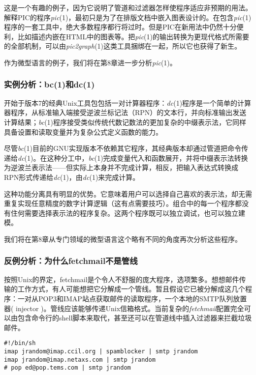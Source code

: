 \documentclass[12pt,oneside]{book}
\begin{document}
\begin{common-format}
这是一个有趣的例子，因为它说明了管道和过滤器怎样使程序适应非预期的用法。解释PIC的程序\textit{pic}(1)，最初只是为了在排版文档中嵌入图表设计的。在包含\textit{pic}(1)程序的一套工具中，绝大多数程序都行将过时。但是PIC在新用法中仍然十分便利，比如描述内嵌在HTML中的图表等。把\textit{pic}(1)的输出转换为更现代格式所需要的全部机制，可以由\textit{pic2graph}(1)这类工具捆绑在一起，所以它也获得了新生。

作为微型语言的例子，我们将在第8章进一步分析\textit{pic}(1)。

\subsubsection{实例分析：bc(1)和dc(1)}
开始于版本7的经典Unix工具包包括一对计算器程序：\textit{dc}(1)程序是一个简单的计算器程序，从标准输入端接受逆波兰标记法（RPN）的文本行，并向标准输出发送计算结果；\textit{bc}(1)程序接受类似传统代数记数法的更加复杂的中缀表示法，它同样具备设置和读取变量并为复杂公式定义函数的能力。

尽管\textit{bc}(1)目前的GNU实现版本不依赖其它程序，其经典版本却通过管道把命令传递给\textit{dc}(1)。在这种分工中，\textit{bc}(1)完成变量代入和函数展开，并将中缀表示法转换为逆波兰表示法——但实际上本身并不完成计算，相反，把输入表达式转换成RPN形式传递给\textit{dc}(1)，由\textit{dc}(1)来完成计算。

这种功能分离具有明显的优势。它意味着用户可以选择自己喜欢的表示法，却无需重复实现任意精度的数字计算逻辑（这有点需要技巧）。组合中的每一个程序都没有住何需要选择表示法的程序复杂。这两个程序既可以独立调试，也可以独立建模。

我们将在第8章从专门领域的微型语言这个略有不同的角度再次分析这些程序。


\subsubsection{反例分析：为什么fetchmail不是管线}
按照Unix的界定，fetchmail是个令人不舒服的庞大程序，选项繁多。想想邮件传输的工作方式，有人可能想把它分解成一个管线。暂且假设它已被分解成这几个程序：一对从POP3和IMAP站点获取邮件的读取程序，一个本地的SMTP队列放置器( injector )。管线应该能够传递Unix信箱格式。当前复杂的\textit{fetchmail}配置完全可以由包含命令行的shell脚本来取代，甚至还可以在管道线中插入过滤器来拦截垃圾邮件。

\begin{Verbatim}
#!/bin/sh
imap jrandom@imap.ccil.org | spamblocker | smtp jrandom
imap jrandom@imap.netaxs.com | smtp jrandom
# pop ed@pop.tems.com | smtp jrandom
\end{Verbatim}


\end{common-format}
\end{document}
